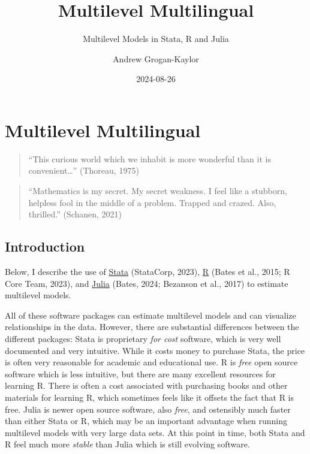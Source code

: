 \documentclass[
  letterpaper,
  DIV=11,
  numbers=noendperiod]{scrreprt}
\title{Multilevel Multilingual}
\subtitle{Multilevel Models in Stata, R and Julia}
\author{Andrew Grogan-Kaylor}
\date{2024-08-26}
\renewcommand*\contentsname{Table of contents}
\newcommand\contentsname{Table of contents}
\begin{document}
\maketitle

\renewcommand*\contentsname{Table of contents}
{
\hypersetup{linkcolor=}
\setcounter{tocdepth}{2}
\tableofcontents
}
\listoftables
{}

\chapter{Multilevel Multilingual}\label{multilevel-multilingual}

\begin{quote}
``This curious world which we inhabit is more wonderful than it is
convenient\ldots{}'' (Thoreau, 1975)
\end{quote}

\begin{quote}
``Mathematics is my secret. My secret weakness. I feel like a stubborn,
helpless fool in the middle of a problem. Trapped and crazed. Also,
thrilled.'' (Schanen, 2021)
\end{quote}

\section{Introduction}\label{introduction}

Below, I describe the use of \href{https://www.stata.com/}{Stata}
(StataCorp, 2023), \href{https://www.r-project.org/}{R} (Bates et al.,
2015; R Core Team, 2023), and \href{https://www.julialang.org/}{Julia}
(Bates, 2024; Bezanson et al., 2017) to estimate multilevel models.

All of these software packages can estimate multilevel models and can
visualize relationships in the data. However, there are substantial
differences between the different packages: Stata is proprietary
\emph{for cost} software, which is very well documented and very
intuitive. While it costs money to purchase Stata, the price is often
very reasonable for academic and educational use. R is \emph{free} open
source software which is less intuitive, but there are many excellent
resources for learning R. There is often a cost associated with
purchasing books and other materials for learning R, which sometimes
feels like it offsets the fact that R is free. Julia is newer open
source software, also \emph{free}, and ostensibly much faster than
either Stata or R, which may be an important advantage when running
multilevel models with very large data sets. At this point in time, both
Stata and R feel much more \emph{stable} than Julia which is still
evolving software.
\end{document}
